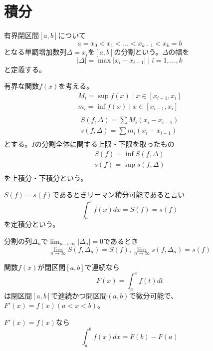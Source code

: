 \section{積分}

\begin{dfn}
	有界閉区間$[a, b]$について
		\[a = x_0 < x_1 < \dots < x_{k-1} < x_k = b\]
	となる単調増加数列$\Delta = {x_i}$を$[a, b]$の分割という。$\Delta$の幅を
		\[|\Delta| = \max{|x_i - x_{i-1}| \mid i = 1,\dots,k}\]
	と定義する。
\end{dfn}

\begin{dfn}
	有界な関数$f(x)$を考える。
	\begin{align*}
		M_i = \sup{f(x) \mid x \in [x_{i-1}, x_i]}\\
		m_i = \inf{f(x) \mid x \in [x_{i-1}, x_i]}\\
	\end{align*}
	\begin{align*}
		S(f, \Delta) = \sum M_i(x_i - x_{i-1})\\
		s(f, \Delta) = \sum m_i(x_i - x_{i-1})\\
	\end{align*}
	とする。$I$の分割全体に関する上限・下限を取ったもの
	\begin{align*}
		S(f) = \inf{S(f, \Delta)}\\
		s(f) = \sup{s(f, \Delta)}\\
	\end{align*}
	を上積分・下積分という。
\end{dfn}
\begin{dfn}[リーマン積分]
	$S(f) = s(f)$であるときリーマン積分可能であると言い
		\[\int_a^b f(x) dx = S(f) = s(f)\]
	を定積分という。
\end{dfn}
\begin{thm}[ダルブーの定理]
	分割の列${\Delta_n}$で$\lim_{n \to \infty} |\Delta_n| = 0$であるとき
		\[\lim_{n \to \infty} S(f, \Delta_n) = S(f), \lim_{n \to \infty} s(f, \Delta_n) = s(f)\]
\end{thm}

\begin{thm}
	関数$f(x)$が閉区間$[a, b]$で連続なら
		\[F(x) = \int_a^x f(t)dt\]
	は閉区間$[a, b]$で連続かつ開区間$(a, b)$で微分可能で、$F'(x) = f(x) (a < x < b)$。
\end{thm}
\begin{cor}
	$F'(x) = f(x)$なら
		\[\int_a^b f(x)dx = F(b) - F(a)\]
\end{cor}